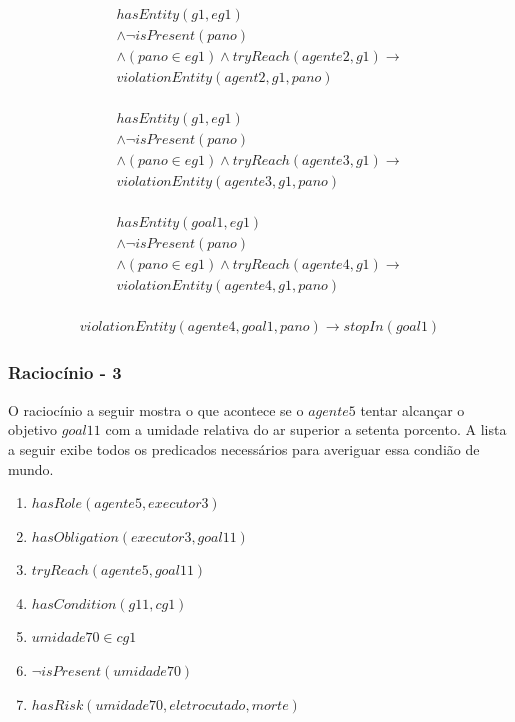 \documentclass[12pt]{article}
\begin{document}
\begin{eqnarray}\nonumber
	hasEntity(g1,eg1) \nonumber \\ 
	\wedge \neg isPresent(pano) 	\nonumber \\ 
	\wedge (pano \in eg1) \wedge tryReach(agente2,g1) \to \nonumber \\ 
	violationEntity(agent2,g1,pano) \nonumber \\
\end{eqnarray}

\begin{eqnarray}\nonumber
	hasEntity(g1,eg1) \nonumber \\ 
	\wedge \neg isPresent(pano) 	\nonumber \\ 
	\wedge (pano \in eg1) \wedge tryReach(agente3,g1) \to \nonumber \\ 
	violationEntity(agente3,g1,pano) \nonumber \\
\end{eqnarray}

\begin{eqnarray}\nonumber
	hasEntity(goal1,eg1) \nonumber \\ 
	\wedge \neg isPresent(pano) 	\nonumber \\ 
	\wedge (pano \in eg1) \wedge tryReach(agente4,g1) \to \nonumber \\ 
	violationEntity(agente4,g1,pano) \nonumber \\
\end{eqnarray}

\begin{eqnarray}
	violationEntity(agente4,goal1,pano) \to stopIn(goal1)
\end{eqnarray}



\subsubsection{Raciocínio - 3} 

O raciocínio a seguir mostra o que acontece se o $agente5$ tentar alcançar o objetivo $goal11$ com a umidade relativa do ar superior a setenta porcento. A lista a seguir exibe todos os predicados necessários para averiguar essa condião de mundo. 

\begin{enumerate}
	\item $hasRole(agente5,executor3)$
	\item $hasObligation(executor3,goal11)$	
	\item $tryReach(agente5,goal11)$ 
	\item $hasCondition(g11,cg1)$
	\item $umidade70 \in cg1$	
	\item $\neg isPresent(umidade70)$
	\item $hasRisk(umidade70,eletrocutado,morte)$
\end{enumerate}
\end{document}
